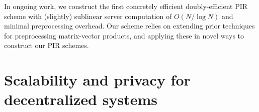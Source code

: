 \documentclass[11pt,letterpaper]{article}
\theoremstyle{definition} %
\theoremstyle{remark} %
\begin{document}
In ongoing work, we construct the first concretely efficient doubly-efficient PIR scheme with (slightly) sublinear server computation of $O(N/\log N)$ and minimal preprocessing overhead.
Our scheme relies on extending prior techniques for preprocessing matrix-vector products, and applying these in novel ways to construct our PIR schemes.




\section{Scalability and privacy for decentralized systems}
\label{sec:decentralized}









\end{document}
